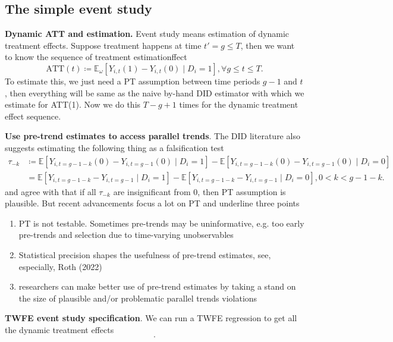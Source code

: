 \documentclass[12pt]{article}
\begin{document}
\subsection{The simple event study}

\textbf{Dynamic ATT and estimation.} Event study means estimation of dynamic treatment
effects. Suppose treatment happens at time \( t' = g \le T \), then we want
to know the sequence of treatment estimationffect
\[
  \text{ATT}(t) \coloneqq \mathbb{E}_{\omega}[Y_{i,t}(1) - Y_{i,t}(0) \mid D_i = 1],
  \forall g \le t \le T
.\]
To estimate this, we just need a PT assumption between time periods \( g-1 \) and \( t
\), then everything will be same as
the naive by-hand DID estimator with which we estimate for ATT(1). Now we do this \(
T-g+1 \) times for the dynamic
treatment effect sequence.

\textbf{Use pre-trend estimates to access parallel trends}. The DID literature also
suggests estimating the following thing
as a falsification test
\begin{align*}
  \tau_{-k} &\coloneqq \mathbb{E}[Y_{i,t=g-1-k}(0)-Y_{i,t=g-1}(0) \mid D_i = 1] -
  \mathbb{E}[Y_{i,t=g-1-k}(0)-Y_{i,t=g-1}(0) \mid D_i = 0] \\
  &= \mathbb{E}[Y_{i,t=g-1-k}-Y_{i,t=g-1} \mid D_i = 1] -
  \mathbb{E}[Y_{i,t=g-1-k}-Y_{i,t=g-1} \mid D_i = 0], 0 < k < g-1-k
  .
\end{align*}
and agree with that if all \( \tau_{-k} \) are insignificant from 0, then PT assumption
is plausible. But recent advancements
focus a lot on PT and underline three points
\begin{enumerate}
  \item PT is not testable. Sometimes pre-trends may be uninformative, e.g. too early
    pre-trends and selection due to time-varying unobservables
  \item Statistical precision shapes the usefulness of pre-trend estimates, see,
    especially, Roth (2022)
  \item researchers can make better use of pre-trend estimates by taking a stand on the
    size of plausible and/or problematic parallel trends violations
\end{enumerate}

\textbf{TWFE event study specification}. We can run a TWFE regression to get all the
dynamic treatment effects
\[

.\]
\end{document}
